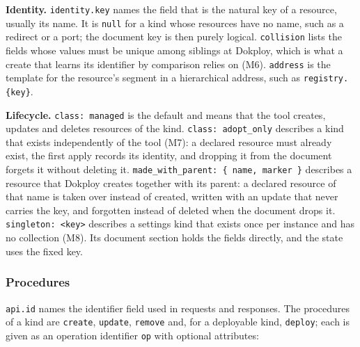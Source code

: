 \textbf{Identity.} \texttt{identity.key} names the field that is the natural key of a resource, usually its name.
It is \texttt{null} for a kind whose resources have no name, such as a redirect or a port; the document key is
then purely logical. \texttt{collision} lists the fields whose values must be unique among siblings at
Dokploy, which is what a create that learns its identifier by comparison relies on (M6).
\texttt{address} is the template for the resource's segment in a hierarchical address, such as
\texttt{registry.\{key\}}.

\textbf{Lifecycle.} \texttt{class:\ managed} is the default and means that the tool creates, updates and deletes
resources of the kind. \texttt{class:\ adopt\_only} describes a kind that exists independently of the tool
(M7): a declared resource must already exist, the first apply records its identity, and dropping it
from the document forgets it without deleting it. \texttt{made\_with\_parent:\ \{\ name,\ marker\ \}} describes a
resource that Dokploy creates together with its parent: a declared resource of that name is taken
over instead of created, written with an update that never carries the key, and forgotten instead of
deleted when the document drops it. \texttt{singleton:\ \textless{}key\textgreater{}} describes a settings kind that exists once per
instance and has no collection (M8). Its document section holds the fields directly, and the state
uses the fixed key.

\subsubsection*{Procedures}

\texttt{api.id} names the identifier field used in requests and responses. The procedures of a kind are
\texttt{create}, \texttt{update}, \texttt{remove} and, for a deployable kind, \texttt{deploy}; each is given as an operation
identifier \texttt{op} with optional attributes:

